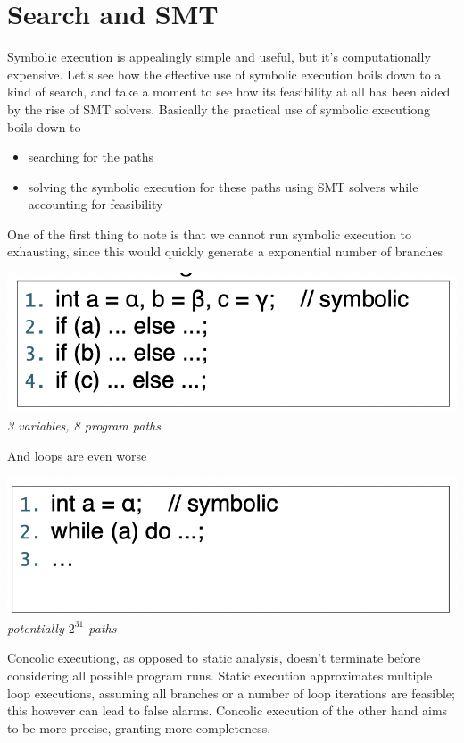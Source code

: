 \documentclass[11pt, oneside]{article}   	%
\begin{document}
\section*{Search and SMT}
Symbolic execution is appealingly simple and useful, but it's computationally expensive. Let's see how the effective use of symbolic execution boils down to a kind of search, and take a moment to see how its feasibility at all has been aided by the rise of SMT solvers. Basically the practical use of symbolic executiong boils down to \begin{itemize}
\item searching for the paths
\item solving the symbolic execution for these paths using SMT solvers while accounting for feasibility
\end{itemize}
One of the first thing to note is that we cannot run symbolic execution to exhausting, since this would quickly generate a exponential number of branches
\begin{center}
\includegraphics[scale = 0.4]{pc1}\\
\emph{3 variables, 8 program paths}\\
\end{center}
And loops are even worse
\begin{center}
\includegraphics[scale = 0.4]{pc2}\\
\emph{potentially $2^{31}$ paths}
\end{center}
Concolic executiong, as opposed to static analysis, doesn't terminate before considering all possible program runs. Static execution approximates multiple loop executions, assuming all branches or a number of loop iterations are feasible; this however can lead to false alarms. Concolic execution of the other hand aims to be more precise, granting more completeness.
\end{document}
